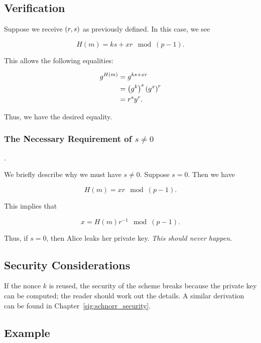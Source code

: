 \subsection{Verification}

Suppose we receive $\left( r,s \right)$ as previously defined.
In this case, we see

\begin{equation}
    H(m) = ks + xr \mod (p-1).
\end{equation}

\noindent
This allows the following equalities:

\begin{align}
    g^{H(m)} &= g^{ks + xr} \nonumber\\
        &= \left( g^{k} \right)^{s}\left( g^{x} \right)^{r} \nonumber\\
        &= r^{s}y^{r}.
\end{align}

\noindent
Thus, we have the desired equality.

\subsubsection{The Necessary Requirement of $s\ne0$}.

We briefly describe why we must have $s\ne0$.
Suppose $s = 0$.
Then we have

\begin{equation}
    H(m) = xr \mod (p-1).
\end{equation}

\noindent
This implies that

\begin{equation}
    x = H(m)r^{-1} \mod (p-1).
\end{equation}

\noindent
Thus, if $s=0$, then Alice leaks her private key.
\emph{This should never happen.}

\subsection{Security Considerations}

If the \gls{nonce} $k$ is reused, the security of the scheme breaks
because the private key can be computed;
the reader should work out the details.
A similar derivation can be found in Chapter~\ref{sig:schnorr_security}.

\subsection{Example}

